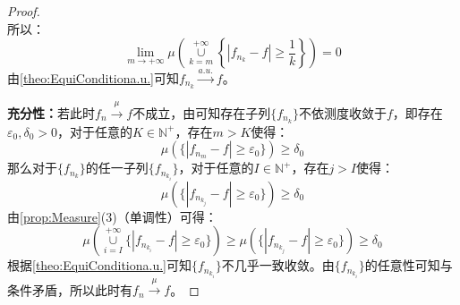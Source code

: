 \begin{proof}
\begin{equation*}
	\end{equation*}
	所以：
	\begin{equation*}
		\lim_{m\to+\infty}\mu\left(\underset{k=m}{\overset{+\infty}{\cup}}\left\{|f_{n_k}-f|\geqslant\frac{1}{k}\right\}\right)=0
	\end{equation*}
	由\cref{theo:EquiConditiona.u.}可知$f_{n_k}\overset{a.u.}{\longrightarrow}f$。\par
	\textbf{充分性：}若此时$f_n\overset{\mu}{\longrightarrow}f$不成立，由可知存在子列$\{f_{n_k}\}$不依测度收敛于$f$，即存在$\varepsilon_0,\delta_0>0$，对于任意的$K\in\mathbb{N}^+$，存在$m>K$使得：
	\begin{equation*}
		\mu(\{|f_{n_m}-f|\geqslant\varepsilon_0\})\geqslant\delta_0
	\end{equation*}
	那么对于$\{f_{n_k}\}$的任一子列$\{f_{n_{k_i}}\}$，对于任意的$I\in\mathbb{N}^+$，存在$j>I$使得：
	\begin{equation*}
		\mu(\{|f_{n_{k_j}}-f|\geqslant\varepsilon_0\})\geqslant\delta_0
	\end{equation*}
	由\cref{prop:Measure}(3)（单调性）可得：
	\begin{equation*}
		\mu\left(\underset{i=I}{\overset{+\infty}{\cup}}\{|f_{n_{k_i}}-f|\geqslant\varepsilon_0\}\right)\geqslant\mu(\{|f_{n_{k_j}}-f|\geqslant\varepsilon_0\})\geqslant\delta_0
	\end{equation*}
	根据\cref{theo:EquiConditiona.u.}可知$\{f_{n_{k_i}}\}$不几乎一致收敛。由$\{f_{n_{k_i}}\}$的任意性可知与条件矛盾，所以此时有$f_n\overset{\mu}{\longrightarrow}f$。
\end{proof}
